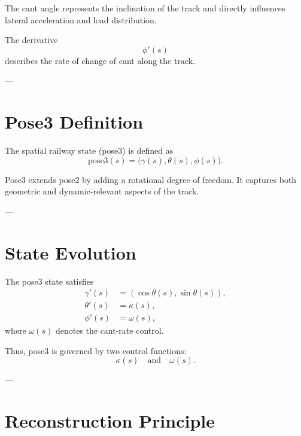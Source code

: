 \begin{remark}
The cant angle represents the inclination of the track and directly
influences lateral acceleration and load distribution.
\end{remark}

\begin{definition}
The derivative
\[
\phi'(s)
\]
describes the rate of change of cant along the track.
\end{definition}

---

\section{Pose3 Definition}

\begin{definition}[Pose3]
The spatial railway state (pose3) is defined as
\[
\mathrm{pose3}(s)
=
\bigl(
\gamma(s),
\theta(s),
\phi(s)
\bigr).
\]
\end{definition}

\begin{remark}
Pose3 extends pose2 by adding a rotational degree of freedom.
It captures both geometric and dynamic-relevant aspects of the track.
\end{remark}

---

\section{State Evolution}

\begin{proposition}
The pose3 state satisfies
\[
\begin{aligned}
\gamma'(s) &= (\cos\theta(s),\sin\theta(s)), \\
\theta'(s) &= \kappa(s), \\
\phi'(s)   &= \omega(s),
\end{aligned}
\]
where \(\omega(s)\) denotes the cant-rate control.
\end{proposition}

\begin{remark}
Thus, pose3 is governed by two control functions:
\[
\kappa(s) \quad \text{and} \quad \omega(s).
\]
\end{remark}

---

\section{Reconstruction Principle}

